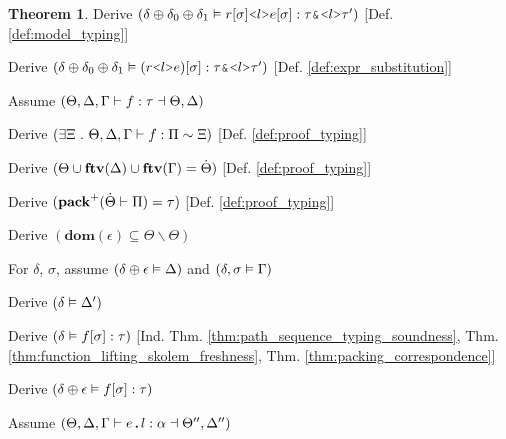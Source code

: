 \documentclass[acmsmall]{acmart}
\theoremstyle{definition}
\newtheorem{theorem}{Theorem}[section]
\begin{document}
\begin{theorem}
  \item \I\I \N Derive $(
    \delta \oplus \delta_0 \oplus \delta_1 \satisfies r[\sigma]\J{<}l\J{>}e[\sigma] \hastype \tau \J{\&} \J{<}l\J{>}\tau'
  )$ [Def. \ref{def:model_typing}]

  \item \I\I \N Derive $(
    \delta \oplus \delta_0 \oplus \delta_1 \satisfies (r\J{<}l\J{>}e)[\sigma] \hastype \tau \J{\&} \J{<}l\J{>}\tau'
  )$ [Def. \ref{def:expr_substitution}]


  \item \N Assume $(
    \Theta, \Delta, \Gamma \vdash f : \tau \dashv \Theta, \Delta
  )$

  \item \I \N Derive $(
    \exists \Xi \ .\  \Theta, \Delta, \Gamma \vdash f : \Pi \sim \Xi
  )$ [Def. \ref{def:proof_typing}]

  \item \I \N Derive $(
    \Theta \cup \textbf{ftv}(\Delta) \cup \textbf{ftv}(\Gamma) = \dot{\Theta}
  )$ [Def. \ref{def:proof_typing}]

  \item \I \N Derive $(
    \textbf{pack}^+(\dot{\Theta} \vdash \Pi) = \tau
  )$ [Def. \ref{def:proof_typing}]

  \item \I \N Derive $(
    \textbf{dom}(\epsilon) \subseteq \Theta \backslash \Theta
  )$

  \item \I \N For $\delta$, $\sigma$,
    assume $(\delta \oplus \epsilon \vDash \Delta)$
    and $(\delta, \sigma \vDash \Gamma)$

  \item \I\I \N Derive $(
    \delta \vDash \Delta'
  )$

  \item \I\I \N Derive $(
    \delta \vDash f[\sigma] : \tau
  )$ [Ind. Thm. \ref{thm:path_sequence_typing_soundness}, Thm. \ref{thm:function_lifting_skolem_freshness},
      Thm. \ref{thm:packing_correspondence}]

  \item \I\I \N Derive $(
    \delta \oplus \epsilon \vDash f[\sigma] : \tau
  )$ 


  \item \N Assume $(
    \Theta, \Delta, \Gamma \entails e \J{.} l \hastype \alpha \given \Theta'', \Delta''
  )$


\end{theorem}
\end{document}
